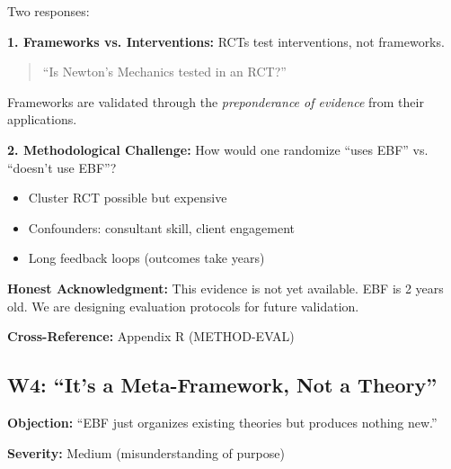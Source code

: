 \begin{axiom}
Two responses:

\textbf{1. Frameworks vs. Interventions:}
RCTs test interventions, not frameworks.
\begin{quote}
``Is Newton's Mechanics tested in an RCT?''
\end{quote}
Frameworks are validated through the \textit{preponderance of evidence} from their applications.

\textbf{2. Methodological Challenge:}
How would one randomize ``uses EBF'' vs. ``doesn't use EBF''?
\begin{itemize}[nosep]
    \item Cluster RCT possible but expensive
    \item Confounders: consultant skill, client engagement
    \item Long feedback loops (outcomes take years)
\end{itemize}

\textbf{Honest Acknowledgment:} This evidence is not yet available. EBF is 2 years old.
We are designing evaluation protocols for future validation.
\end{axiom}

\textbf{Cross-Reference:} Appendix R (METHOD-EVAL)

\subsection{W4: ``It's a Meta-Framework, Not a Theory''}
\label{sec:da-w4}

\begin{tcolorbox}[colback=gray!5!white, colframe=gray!75!black]
\textbf{Objection:} ``EBF just organizes existing theories but produces nothing new.''

\textbf{Severity:} Medium (misunderstanding of purpose)
\end{tcolorbox}

